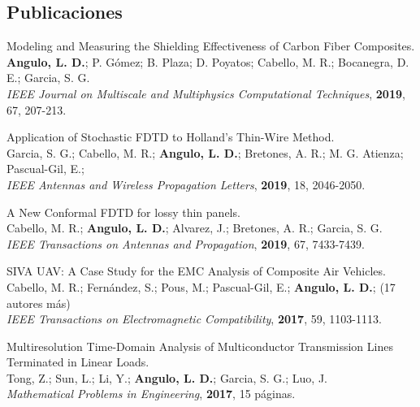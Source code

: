 \documentclass[a4paper,margin,line]{res}
\begin{document}
\begin{resume}
\begin{minipage}{\textwidth}
	\section{\sc Publicaciones}
	Modeling and Measuring the Shielding Effectiveness of Carbon Fiber Composites.\\
	 \textbf{Angulo, L. D.}; P. Gómez; B. Plaza; D. Poyatos; Cabello, M. R.; Bocanegra, D. E.; Garcia, S. G.\\
	{\it IEEE Journal on Multiscale and Multiphysics Computational Techniques}, \textbf{2019}, 67, 207-213.
\end{minipage}

\begin{minipage}{\textwidth}
    Application of Stochastic FDTD to Holland's Thin-Wire Method.\\
	Garcia, S. G.; Cabello, M. R.; \textbf{Angulo, L. D.}; Bretones, A. R.; M. G. Atienza; Pascual-Gil, E.; \\
	{\it IEEE Antennas and Wireless Propagation Letters}, \textbf{2019}, 18, 2046-2050.
\end{minipage}

\begin{minipage}{\textwidth}
	A New Conformal FDTD for lossy thin panels.\\
	Cabello, M. R.; \textbf{Angulo, L. D.}; Alvarez, J.;  Bretones, A. R.;  Garcia, S. G.\\
	{\it IEEE Transactions on Antennas and Propagation}, \textbf{2019}, 67, 7433-7439.
\end{minipage}

\begin{minipage}{\textwidth}
  SIVA UAV: A Case Study for the EMC Analysis of Composite Air Vehicles.\\
  Cabello, M. R.; Fernández, S.; Pous, M.; Pascual-Gil, E.; \textbf{Angulo, L. D.}; (17 autores más)\\
  {\it IEEE Transactions on Electromagnetic Compatibility}, \textbf{2017}, 59, 1103-1113.
\end{minipage}

\begin{minipage}{\textwidth}
 Multiresolution Time-Domain Analysis of Multiconductor Transmission Lines Terminated in Linear Loads.\\
  Tong, Z.; Sun, L.; Li, Y.; \textbf{Angulo, L. D.}; Garcia, S. G.; Luo, J.\\
  {\it Mathematical Problems in Engineering}, {\bf 2017}, 15 páginas.
\end{minipage}


\end{resume}
\end{document}
